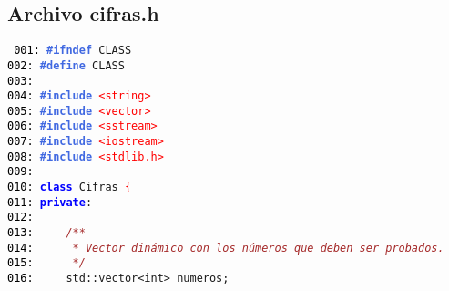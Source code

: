 \documentclass[a4paper,10pt]{scrartcl}
\begin{document}
   \subsection{Archivo cifras.h}
   \small
   \texttt{%
   \noindent
   \mbox{}\texttt{\textcolor{Black}{001:}} \textbf{\textcolor{RoyalBlue}{\#ifndef}}\ CLASS \\
   \mbox{}\texttt{\textcolor{Black}{002:}} \textbf{\textcolor{RoyalBlue}{\#define}}\ CLASS \\
   \mbox{}\texttt{\textcolor{Black}{003:}}  \\
   \mbox{}\texttt{\textcolor{Black}{004:}} \textbf{\textcolor{RoyalBlue}{\#include}}\ \texttt{\textcolor{Red}{\textless{}string\textgreater{}}} \\
   \mbox{}\texttt{\textcolor{Black}{005:}} \textbf{\textcolor{RoyalBlue}{\#include}}\ \texttt{\textcolor{Red}{\textless{}vector\textgreater{}}} \\
   \mbox{}\texttt{\textcolor{Black}{006:}} \textbf{\textcolor{RoyalBlue}{\#include}}\ \texttt{\textcolor{Red}{\textless{}sstream\textgreater{}}} \\
   \mbox{}\texttt{\textcolor{Black}{007:}} \textbf{\textcolor{RoyalBlue}{\#include}}\ \texttt{\textcolor{Red}{\textless{}iostream\textgreater{}}} \\
   \mbox{}\texttt{\textcolor{Black}{008:}} \textbf{\textcolor{RoyalBlue}{\#include}}\ \texttt{\textcolor{Red}{\textless{}stdlib.h\textgreater{}}} \\
   \mbox{}\texttt{\textcolor{Black}{009:}}  \\
   \mbox{}\texttt{\textcolor{Black}{010:}} \textbf{\textcolor{Blue}{class}}\ \textcolor{TealBlue}{Cifras}\ \textcolor{Red}{\{} \\
   \mbox{}\texttt{\textcolor{Black}{011:}} \textbf{\textcolor{Blue}{private}}\textcolor{BrickRed}{:} \\
   \mbox{}\texttt{\textcolor{Black}{012:}} \ \ \ \  \\
   \mbox{}\texttt{\textcolor{Black}{013:}} \ \ \ \ \textit{\textcolor{Brown}{/**}} \\
   \mbox{}\texttt{\textcolor{Black}{014:}} \textit{\textcolor{Brown}{\ \ \ \ \ *\ Vector\ dinámico\ con\ los\ números\ que\ deben\ ser\ probados.}} \\
   \mbox{}\texttt{\textcolor{Black}{015:}} \textit{\textcolor{Brown}{\ \ \ \ \ */}} \\
   \mbox{}\texttt{\textcolor{Black}{016:}} \ \ \ \ std\textcolor{BrickRed}{::}\textcolor{TealBlue}{vector\textless{}int\textgreater{}}\ numeros\textcolor{BrickRed}{;} \\
}
\end{document}
